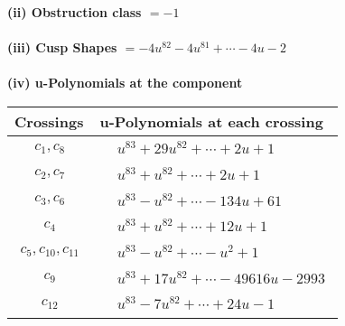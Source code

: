 \documentclass[1p]{elsarticle_modified}
\theoremstyle{definition}
\begin{document}
\flushleft \textbf{(ii) Obstruction class $= -1$}\\~\\
\flushleft \textbf{(iii) Cusp Shapes $= -4 u^{82}-4 u^{81}+\cdots-4 u-2$}\\~\\
\newpage\renewcommand{\arraystretch}{1}
\flushleft \textbf{(iv) u-Polynomials at the component}\newline \\
\begin{tabular}{m{50pt}|m{274pt}}
Crossings & \hspace{64pt}u-Polynomials at each crossing \\
\hline $$\begin{aligned}c_{1},c_{8}\end{aligned}$$&$\begin{aligned}
&u^{83}+29 u^{82}+\cdots+2 u+1
\end{aligned}$\\
\hline $$\begin{aligned}c_{2},c_{7}\end{aligned}$$&$\begin{aligned}
&u^{83}+u^{82}+\cdots+2 u+1
\end{aligned}$\\
\hline $$\begin{aligned}c_{3},c_{6}\end{aligned}$$&$\begin{aligned}
&u^{83}- u^{82}+\cdots-134 u+61
\end{aligned}$\\
\hline $$\begin{aligned}c_{4}\end{aligned}$$&$\begin{aligned}
&u^{83}+u^{82}+\cdots+12 u+1
\end{aligned}$\\
\hline $$\begin{aligned}c_{5},c_{10},c_{11}\end{aligned}$$&$\begin{aligned}
&u^{83}- u^{82}+\cdots- u^2+1
\end{aligned}$\\
\hline $$\begin{aligned}c_{9}\end{aligned}$$&$\begin{aligned}
&u^{83}+17 u^{82}+\cdots-49616 u-2993
\end{aligned}$\\
\hline $$\begin{aligned}c_{12}\end{aligned}$$&$\begin{aligned}
&u^{83}-7 u^{82}+\cdots+24 u-1
\end{aligned}$\\
\hline
\end{tabular}\\~\\
\end{document}
